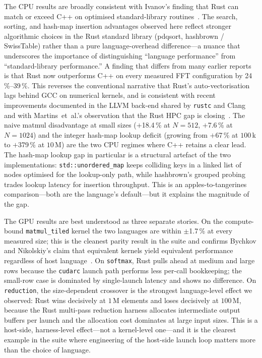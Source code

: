 \documentclass{article}
\begin{document}
The CPU results are broadly consistent with Ivanov's finding that Rust
can match or exceed C++ on optimised standard-library
routines~\cite{ivanov2022rust}.
The search, sorting, and hash-map insertion advantages observed here
reflect stronger algorithmic choices in the Rust standard library
(pdqsort, hashbrown / SwissTable) rather than a pure language-overhead
difference---a nuance that underscores the importance of distinguishing
``language performance'' from ``standard-library performance.''
A finding that differs from many earlier reports is that Rust now
outperforms C++ on every measured FFT configuration by 24\,\%--39\,\%.
This reverses the conventional narrative that Rust's
auto-vectorisation lags behind GCC on numerical kernels, and is
consistent with recent improvements documented in the LLVM back-end
shared by \texttt{rustc} and Clang and with Martins~et~al.'s
observation that the Rust HPC gap is closing~\cite{martins2025npb}.
The naive matmul disadvantage at small sizes ($+$18.4\,\% at $N=512$,
$+$7.6\,\% at $N=1024$) and the integer hash-map lookup deficit
(growing from $+$67\,\% at $100$\,k to $+$379\,\% at $10$\,M) are the
two CPU regimes where C++ retains a clear lead.
The hash-map lookup gap in particular is a structural artefact of the
two implementations: \texttt{std::unordered\_map} keeps colliding keys
in a linked list of nodes optimised for the lookup-only path, while
hashbrown's grouped probing trades lookup latency for insertion
throughput.
This is an apples-to-tangerines comparison---both are the language's
default---but it explains the magnitude of the gap.

The GPU results are best understood as three separate stories.
On the compute-bound \texttt{matmul\_tiled} kernel the two languages
are within $\pm$1.7\,\% at every measured size; this is the cleanest
parity result in the suite and confirms Bychkov and Nikolskiy's claim
that equivalent kernels yield equivalent performance regardless of host
language~\cite{bychkov2022rust}.
On \texttt{softmax}, Rust pulls ahead at medium and large rows because
the \texttt{cudarc} launch path performs less per-call bookkeeping; the
small-row case is dominated by single-launch latency and shows no
difference.
On \texttt{reduction}, the size-dependent crossover is the strongest
language-level effect we observed: Rust wins decisively at
$1$\,M elements and loses decisively at $100$\,M, because the Rust
multi-pass reduction harness allocates intermediate output buffers per
launch and the allocation cost dominates at large input sizes.
This is a host-side, harness-level effect---not a kernel-level one---and
it is the clearest example in the suite where engineering of the
host-side launch loop matters more than the choice of language.
\end{document}
